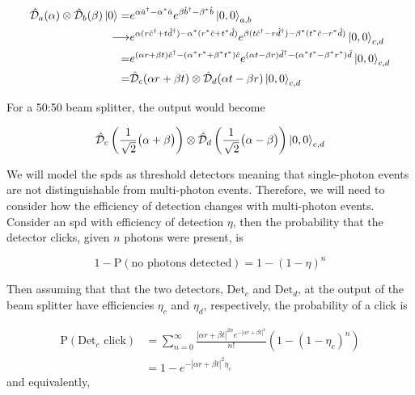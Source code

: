 \begin{align}
	\hat{\mathcal{D}}_a(\alpha)\otimes\hat{\mathcal{D}}_b(\beta)\ket{0} =&  e^{\alpha \hat{a}^\dagger - \alpha^\ast \hat{a}} e^{\beta \hat{b}^\dagger - \beta^\ast \hat{b}}\ket{0,0}_{a,b}\\
	\longrightarrow&  e^{\alpha (r \hat{c}^\dagger + t \hat{d}^\dagger) - \alpha^\ast (r^\ast \hat{c} + t^\ast \hat{d})}e^{\beta (t \hat{c}^\dagger - r \hat{d}^\dagger) - \beta^\ast (t^\ast \hat{c} - r^\ast \hat{d})}\ket{0,0}_{c,d}\\
	=&  e^{(\alpha r + \beta t) \hat{c}^\dagger - (\alpha^\ast r^\ast + \beta^\ast t^\ast) \hat{c}} e^{(\alpha t - \beta r) \hat{d}^\dagger - (\alpha^\ast t^\ast - \beta^\ast r^\ast) \hat{d}}\ket{0,0}_{c,d}\\
	=&  \hat{\mathcal{D}}_c(\alpha r + \beta t)\otimes\hat{\mathcal{D}}_d(\alpha t - \beta r)\ket{0,0}_{c,d}
\end{align}

For a 50:50 beam splitter, the output would become

\begin{equation}
	\hat{\mathcal{D}}_c\left(\frac{1}{\sqrt{2}}\big(\alpha + \beta\big)\right)\otimes\hat{\mathcal{D}}_d\left(\frac{1}{\sqrt{2}}\big(\alpha - \beta\big)\right)\ket{0,0}_{c,d}
\end{equation}

We will model the \acp{spd} as threshold detectors meaning that single-photon events are not distinguishable from multi-photon events. Therefore, we will need to consider how the efficiency of detection changes with multi-photon events. Consider an \ac{spd} with efficiency of detection $\eta$, then the probability that the detector clicks, given $n$ photons were present, is

\begin{equation}
	1 - \text{P}\left(\text{no photons detected}\right) = 1 - (1 - \eta)^n
\end{equation}

Then assuming that that the two detectors, $\text{Det}_c$ and $\text{Det}_d$, at the output of the beam splitter have efficiencies $\eta_c$ and $\eta_d$, respectively, the probability of a click is

\begin{align}
	\text{P}(\text{Det}_c \text{ click}) &= \sum_{n=0}^\infty \frac{|\alpha r + \beta t|^{2n} e^{-|\alpha r + \beta t|^2}}{n!}(1-(1-\eta_c)^n)\\
	&= 1 - e^{-|\alpha r + \beta t|^2 \eta_c}
\end{align}
and equivalently,

